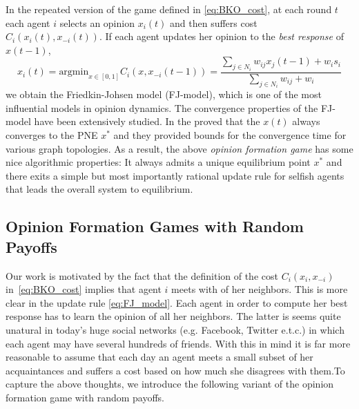 In the repeated version of the game defined in \ref{eq:BKO_cost}, at each round $t$ each agent $i$
selects an opinion $x_i(t)$ and then suffers cost $C_i(x_i(t),x_{-i}(t))$. If each agent updates
her opinion to the \emph{best response} of $x(t-1)$,
\begin{equation}\label{eq:FJ_model}
x_i(t) = \text{argmin}_{x \in [0,1]}C_i(x,x_{-i}(t-1))=\frac{\sum_{j \in N_i}w_{ij}x_j(t-1) + w_is_i}{\sum_{j \in N_i}w_{ij} + w_i} 
\end{equation}
\noindent we obtain the Friedkin-Johsen model (FJ-model), which is one of the most influential models in opinion dynamics.
The convergence properties of the FJ-model have been extensively studied. In \cite{GS14} the proved that the $x(t)$ always converges
to the PNE $x^*$ and they provided bounds for the convergence time for various graph topologies. As a result, the 
above \emph{opinion formation game} has some nice algorithmic properties: It always admits a unique equilibrium point $x^*$ and there
exits a simple but most importantly rational update rule for selfish agents that leads the overall system to equilibrium.

\subsection{Opinion Formation Games with Random Payoffs}
Our work is motivated by the fact that the definition of the cost $C_i(x_i,x_{-i})$ 
in~\ref{eq:BKO_cost} implies that agent $i$ meets with of her neighbors. This is more
clear in the update rule \ref{eq:FJ_model}. Each agent in order to compute her best response
has to learn the opinion of all her neighbors. The latter is seems quite unatural in today's
huge social networks (e.g. Facebook, Twitter e.t.c.) in which each agent may have
several hundreds of friends. With this in mind it is far more reasonable to assume 
that each day an agent meets a small subset of her acquaintances and
suffers a cost based on how much she disagrees with them.To capture the above thoughts, 
we introduce the following variant of the opinion formation game with random
payoffs.

